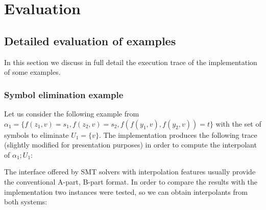 \section{Evaluation}

\subsection{Detailed evaluation of examples}

In this section we discuss in full detail the execution trace
of the implementation of some examples. 

\subsubsection{Symbol elimination example}

Let us consider the following example from \cite{KAPUR2017} 
$\alpha_1 = \{f(z_1, v) = s_1, f(z_2, v) = s_2, f(f(y_1, v), f(y_2, v)) = t\}$
with the set of symbols to eliminate $U_1 = \{v\}$. The implementation produces the following
trace (slightly modified for presentation purposes) in order to compute 
the interpolant of $\alpha_1; U_1$:



The interface offered by SMT solvers with interpolation features usually provide the 
conventional A-part, B-part format. In order to compare the results with the implementation two 
instances were tested, so we can obtain interpolants from both systems:

